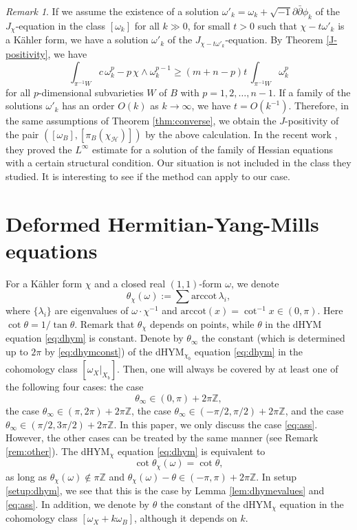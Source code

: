 \documentclass{amsart}
\numberwithin{equation}{section}
\theoremstyle{plain}
\theoremstyle{definition}
\theoremstyle{remark}
\newtheorem{remark}[equation]{Remark}
\begin{document}
\begin{remark}\label{rem:collapsing}
If we assume the existence of a solution $\omega'_k = \omega_k+ \sqrt{-1}\partial\bar{\partial}\phi_k$ of the $J_\chi$-equation in the class $[\omega_k]$ for all $k \gg 0$,  
for small $t>0$ such that $\chi-t\omega'_k$ is a K{\"a}hler form, 
we have a solution $\omega'_k$ of the $J_{\chi-t\omega'_k}$-equation. 
By Theorem \ref{J-positivity}, we have 
$$\int_{\pi^{-1}W} c \, \omega_k^p - p \, \chi \wedge \omega_k^{p-1}
\ge
(m+n-p)t \, \int_{\pi^{-1}W} \omega_k^p$$
for all $p$-dimensional subvarieties $W$ of  $B$ with $p = 1,2,\dots,{n-1}$.
If a family of the solutions $\omega'_k$ has an order $O(k)$ as $k \rightarrow \infty$, we have $t = O\left(k^{-1}\right)$. Therefore, in the same assumptions of Theorem \ref{thm:converse}, we obtain the $J$-positivity of the pair $([\omega_B],[\pi_B(\chi_\mathcal{H})])$ by the above calculation. In the recent work \cite{GPT}, they proved the $L^\infty$ estimate for a solution of the family of Hessian equations with a certain structural condition. Our situation is not included in the class they studied. It is interesting to see if the method can apply to our case.
\end{remark}



\section{Deformed Hermitian-Yang-Mills equations}\label{sec:dHYM}
For a K{\"a}hler form $\chi$ and a closed real $(1,1)$-form $\omega$, we denote 
\begin{equation}\label{eq:theta}
    \theta_\chi(\omega):=\sum\mathrm{arccot}\, \lambda_i,
\end{equation}
where $\{\lambda_i\}$ are eigenvalues of $\omega\cdot\chi^{-1}$ and $\mathrm{arccot}(x)=\cot^{-1} x\in(0,\pi)$. Here $\cot\theta=1/\tan\theta$. 
Remark that $\theta_\chi$ depends on points, while $\theta$ in the dHYM equation \eqref{eq:dhym} is constant.
Denote by $\theta_\infty$ the constant (which is determined up to $2\pi$ by \eqref{eq:dhymconst}) of the dHYM$_{\chi_b}$ equation \eqref{eq:dhym} in the cohomology class $[\omega_X|_{X_b}]$.
Then, one will always be covered by at least one of the following four cases: the case
\begin{equation}\label{eq:ass}
    \theta_\infty\in(0,\pi)+2\pi\mathbb{Z}, 
\end{equation}
the case $\theta_\infty\in(\pi,2\pi)+2\pi\mathbb{Z}$, the case $\theta_\infty\in(-\pi/2,\pi/2)+2\pi\mathbb{Z}$, and the case $\theta_\infty\in(\pi/2,3\pi/2)+2\pi\mathbb{Z}$.
In this paper, we only discuss the case \eqref{eq:ass}. However, the other cases can be treated by the same manner (see Remark \ref{rem:other}).
The dHYM$_\chi$ equation \eqref{eq:dhym} is equivalent to
$$\cot\theta_\chi(\omega)=\cot\theta,$$
as long as $\theta_\chi(\omega)\notin\pi\mathbb{Z}$ and $\theta_\chi(\omega)-\theta\in(-\pi,\pi)+2\pi\mathbb{Z}$. 
In setup \ref{setup:dhym}, we see that this is the case by Lemma \ref{lem:dhymevalues} and \eqref{eq:ass}. 
In addition, we denote by $\theta$ the constant of the dHYM$_\chi$ equation in the cohomology class $[\omega_X+k\omega_B]$, although it depends on $k$.
\end{document}
